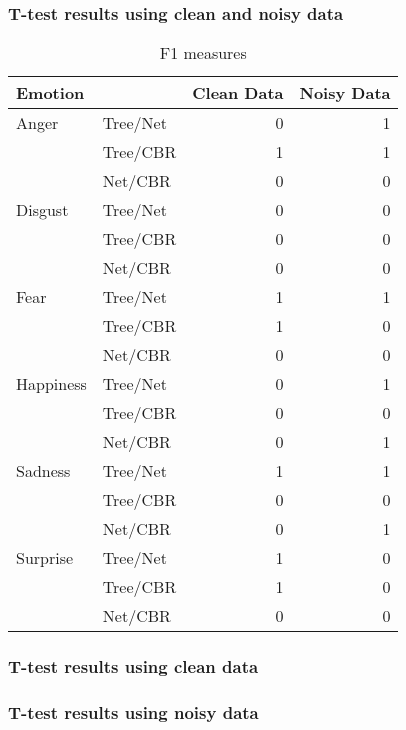 \documentclass[12pt]{article}
\begin{document}
\subsubsection*{T-test results using clean and noisy data}
\begin{table}
\centering
\begin{tabular}{l l | r r}
Emotion   &          & Clean Data & Noisy Data \\
\hline
Anger     & Tree/Net & 0          & 1          \\
          & Tree/CBR & 1          & 1          \\
          & Net/CBR  & 0          & 0          \\
Disgust   & Tree/Net & 0          & 0          \\
          & Tree/CBR & 0          & 0          \\
          & Net/CBR  & 0          & 0          \\
Fear      & Tree/Net & 1          & 1          \\
          & Tree/CBR & 1          & 0          \\
          & Net/CBR  & 0          & 0          \\
Happiness & Tree/Net & 0          & 1          \\
          & Tree/CBR & 0          & 0          \\
          & Net/CBR  & 0          & 1          \\
Sadness   & Tree/Net & 1          & 1          \\
          & Tree/CBR & 0          & 0          \\
          & Net/CBR  & 0          & 1          \\
Surprise  & Tree/Net & 1          & 0          \\
          & Tree/CBR & 1          & 0          \\
          & Net/CBR  & 0          & 0          \\
\end{tabular}
\caption{F1 measures}
\end{table}

\subsubsection*{T-test results using clean data}

\subsubsection*{T-test results using noisy data}
\end{document}
